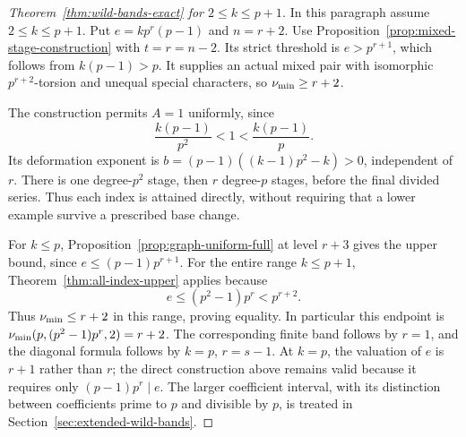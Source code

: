 \begin{proof}[Theorem~\ref{thm:wild-bands-exact} for $2\le k\le p+1$]
In this paragraph assume $2\le k\le p+1$. Put $e=kp^r(p-1)$ and $n=r+2$. Use Proposition~\ref{prop:mixed-stage-construction} with $t=r=n-2$. Its strict threshold is $e>p^{r+1}$, which follows from $k(p-1)>p$. It supplies an actual mixed pair with isomorphic $p^{r+2}$-torsion and unequal special characters, so $\nu_{\min}\ge r+2$.

The construction permits $A=1$ uniformly, since
\[
                \frac{k(p-1)}{p^2}<1<\frac{k(p-1)}p.
\]
Its deformation exponent is $b=(p-1)((k-1)p^2-k)>0$, independent of $r$. There is one degree-$p^2$ stage, then $r$ degree-$p$ stages, before the final divided series. Thus each index is attained directly, without requiring that a lower example survive a prescribed base change.

For $k\le p$, Proposition~\ref{prop:graph-uniform-full} at level $r+3$ gives the upper bound, since $e\le(p-1)p^{r+1}$. For the entire range $k\le p+1$, Theorem~\ref{thm:all-index-upper} applies because
\[
 e\le(p^2-1)p^r<p^{r+2}.
\]
Thus $\nu_{\min}\le r+2$ in this range, proving equality. In particular this endpoint is $\nu_{\min}(p,(p^2-1)p^r,2)=r+2$. The corresponding finite band follows by $r=1$, and the diagonal formula follows by $k=p$, $r=s-1$. At $k=p$, the valuation of $e$ is $r+1$ rather than $r$; the direct construction above remains valid because it requires only $(p-1)p^r\mid e$. The larger coefficient interval, with its distinction between coefficients prime to $p$ and divisible by $p$, is treated in Section~\ref{sec:extended-wild-bands}.
\end{proof}
